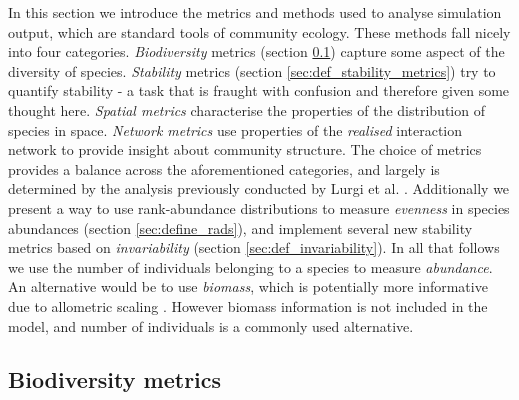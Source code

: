 In this section we introduce the metrics and methods used to analyse simulation output, which are standard tools of community ecology. These methods fall nicely into four categories. \emph{Biodiversity} metrics (section \ref{sec:define_dviersity}) capture some aspect of the diversity of species. \emph{Stability} metrics (section \ref{sec:def_stability_metrics}) try to quantify stability - a task that is fraught with confusion and therefore given some thought here. \emph{Spatial metrics} characterise the properties of the distribution of species in space. \emph{Network metrics} use properties of the \emph{realised} interaction network to provide insight about community structure. The choice of metrics provides a balance across the aforementioned categories, and largely is determined by the analysis previously conducted by Lurgi et al. \cite{lurgi2015effects}. Additionally we present a way to use rank-abundance distributions to measure \emph{evenness} in species abundances (section \ref{sec:define_rads}), and implement several new stability metrics based on \emph{invariability} (section \ref{sec:def_invariability}). In all that follows we use the number of individuals belonging to a species to measure \emph{abundance}. An alternative would be to use \emph{biomass}, which is potentially more informative due to allometric scaling \cite{west1997general}. However biomass information is not included in the model, and number of individuals is a commonly used alternative.



\subsection{Biodiversity metrics}
\label{sec:define_dviersity}

